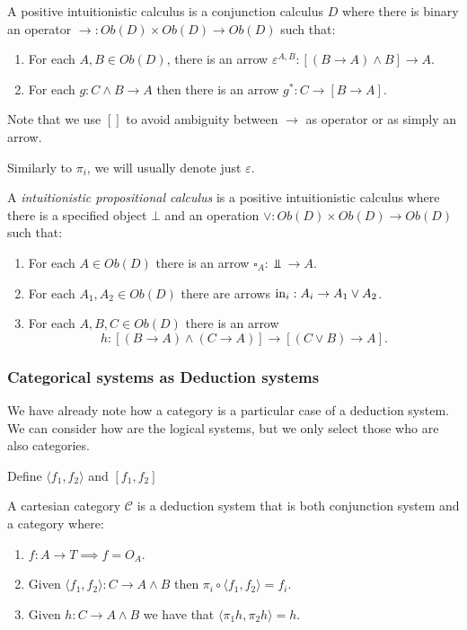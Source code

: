 \begin{definition} \label{def:positivecalculus}
  A positive intuitionistic calculus is a conjunction calculus $D$ where there is binary an operator $\to: Ob(D)\times Ob(D) \to Ob(D)$ such that:
  \begin{enumerate}
  \item For each $A,B \in Ob(D)$, there is an arrow $\varepsilon^{A,B}: [(B \to A) \land B]\to A$.
  \item For each $g:C\land B \to A$ then there is an arrow $g^*: C\to [B\to A]$.
  \end{enumerate}
\end{definition}
\begin{remark}
  Note that we use $[]$ to avoid ambiguity between $\to$ as operator or as simply an arrow.
\end{remark}
Similarly to $\pi_i$, we will usually denote just $\varepsilon$. 
\begin{definition}
  A \emph{intuitionistic propositional calculus} is a positive intuitionistic calculus where there is a specified object $\bot$ and an operation $\lor: Ob(D)\times Ob(D) \to Ob(D)$ such that:
  \begin{enumerate}
  \item For each $A\in Ob(D)$ there is an arrow $\square_A: \Bot\to A$.
  \item For each $A_1,A_2\in Ob(D)$ there are arrows $\operatorname{in}_i: A_i\to A_1 \lor A_2 $.
  \item For each $A,B,C \in Ob(D)$ there is an arrow $$h:[(B\to A)\land (C\to A)] \to [(C\lor B)\to A].$$
  \end{enumerate}
\end{definition}

\subsubsection{Categorical systems as Deduction systems}

We have already note how a category is a particular case of a deduction system. We can consider how are the logical systems, but we only select those who are also categories.\\

\begin{remark} {\color{red} Define $\langle f_1,f_2\rangle$ and $[f_1,f_2]$}
  
\end{remark}


\begin{proposition}
  A cartesian category $\mathcal{C}$ is a deduction system that is both conjunction system and a category where:
  \begin{enumerate}
  \item $f:A\to T\implies f=O_A$.
  \item Given $\langle f_1,f_2\rangle: C\to A\land B$ then $\pi_i \circ \langle f_1,f_2\rangle = f_i$.
  \item Given $h:C\to A\land B$ we have that $\langle \pi_1 h, \pi_2 h\rangle = h$.
  \end{enumerate}
\end{proposition}

